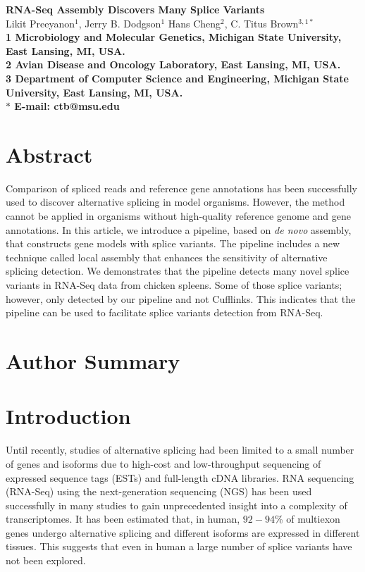 \documentclass[10pt]{article}
\date{}
\begin{document}
\begin{flushleft}
{\Large
\textbf{RNA-Seq Assembly Discovers Many Splice Variants}
}
\\
Likit Preeyanon$^{1}$, 
Jerry B. Dodgson$^{1}$
Hans Cheng$^{2}$, 
C. Titus Brown$^{3,1 \ast}$
\\
\bf{1} Microbiology and Molecular Genetics, Michigan State University, East Lansing, MI, USA.
\\
\bf{2} Avian Disease and Oncology Laboratory, East Lansing, MI, USA.
\\
\bf{3} Department of Computer Science and Engineering, Michigan State University, East Lansing, MI, USA.
\\
$\ast$ E-mail: ctb@msu.edu
\end{flushleft}

\section*{Abstract}
Comparison of spliced reads and reference gene annotations has been successfully used to discover alternative
splicing in model organisms. However, the method cannot be applied in organisms without high-quality reference genome and
gene annotations. In this article, we introduce a pipeline, based on \emph{de novo} assembly, that constructs gene models with splice
variants.
The pipeline includes a new technique called local assembly that enhances the sensitivity of
alternative splicing detection.
We demonstrates that the pipeline detects many novel splice variants in RNA-Seq data from chicken spleens.
Some of those splice variants; however, only detected by our pipeline and not Cufflinks.
This indicates that the pipeline can be used to facilitate splice variants detection from RNA-Seq.
\section*{Author Summary}

\section*{Introduction}
Until recently, studies of alternative splicing had been limited to a small
number of genes and isoforms due to high-cost and low-throughput sequencing
of expressed sequence tags (ESTs) and full-length cDNA libraries.  
RNA sequencing (RNA-Seq) using the next-generation sequencing (NGS) has been
used successfully in many studies to gain unprecedented insight into a
complexity of transcriptomes.
It has been estimated that, in human, $92-94$\% of multiexon genes undergo alternative
splicing and different isoforms are expressed in different tissues\cite{Wang:2008ea}.
This suggests that even in human a large number of splice variants have not been explored.
\end{document}

